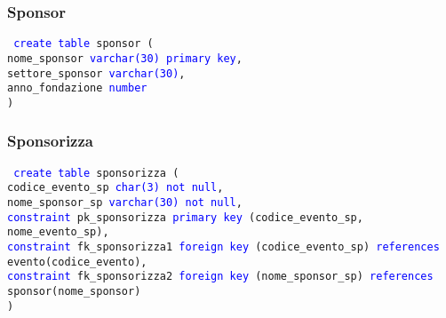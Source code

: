 \documentclass{article}
\begin{document}
    \subsubsection{Sponsor}
    \begin{flushleft}
        \texttt{
        \textcolor{blue}{create table} sponsor ( \\
        \hspace*{2em} nome\_sponsor \hspace*{2em} \textcolor{blue}{varchar(30)} \hspace*{4em} \textcolor{blue}{primary key}, \\
        \hspace*{2em} settore\_sponsor \hspace*{0.6em} \textcolor{blue}{varchar(30)}, \\
        \hspace*{2em} anno\_fondazione \hspace*{0.6em} \textcolor{blue}{number} \\)}
    \end{flushleft}

    \subsubsection{Sponsorizza}
    \begin{flushleft}
        \texttt{
        \textcolor{blue}{create table} sponsorizza ( \\
        \hspace*{2em} codice\_evento\_sp \hspace*{2.7em} \textcolor{blue}{char(3)} \hspace*{4em} \textcolor{blue}{not null}, \\
        \hspace*{2em} nome\_sponsor\_sp \hspace*{3.2em} \textcolor{blue}{varchar(30)} \hspace*{2em} \textcolor{blue}{not null}, \\
        \hspace*{2em} \textcolor{blue}{constraint} pk\_sponsorizza \textcolor{blue}{primary key} (codice\_evento\_sp, nome\_evento\_sp), \\
        \hspace*{2em} \textcolor{blue}{constraint} fk\_sponsorizza1 \textcolor{blue}{foreign key} (codice\_evento\_sp) \textcolor{blue}{references} \hspace*{2em} evento(codice\_evento), \\
        \hspace*{2em} \textcolor{blue}{constraint} fk\_sponsorizza2 \textcolor{blue}{foreign key} (nome\_sponsor\_sp) \textcolor{blue}{references} \hspace*{2em} sponsor(nome\_sponsor) \\)}
    \end{flushleft}
\end{document}
